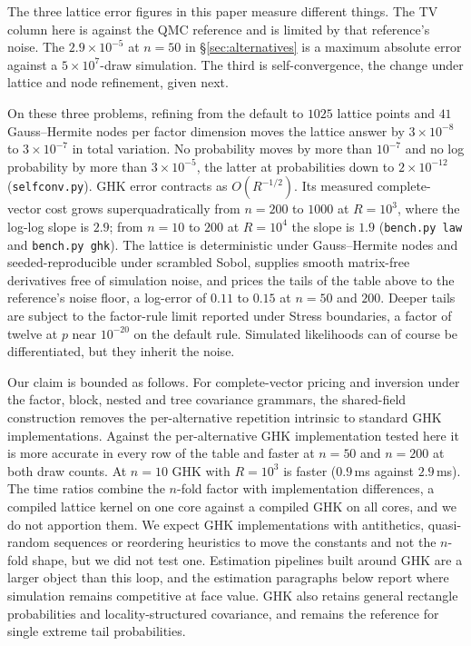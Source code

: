 \documentclass[11pt]{article}
\begin{document}
The three lattice error figures in this paper measure different things.
The TV column here is against the QMC reference and is limited by that
reference's noise. The $2.9\times10^{-5}$ at $n=50$ in
\S\ref{sec:alternatives} is a maximum absolute error against a
$5\times10^{7}$-draw simulation. The third is self-convergence, the
change under lattice and node refinement, given next.

On these three problems, refining from the default to $1025$ lattice
points and $41$ Gauss--Hermite nodes per factor dimension moves the
lattice answer by $3\times10^{-8}$ to $3\times10^{-7}$ in total
variation. No probability moves by more than $10^{-7}$ and no log
probability by more than $3\times10^{-5}$, the latter at probabilities
down to $2\times10^{-12}$ (\texttt{selfconv.py}). GHK error
contracts as $O(R^{-1/2})$. Its measured complete-vector cost grows
superquadratically from $n=200$ to $1000$ at $R=10^3$, where the log-log
slope is $2.9$; from $n=10$ to $200$ at $R=10^4$ the slope is $1.9$
(\texttt{bench.py law} and \texttt{bench.py ghk}). The lattice is deterministic under Gauss--Hermite nodes and
seeded-reproducible under scrambled Sobol, supplies smooth matrix-free
derivatives free of simulation noise, and prices the tails of the table
above to the reference's noise floor, a log-error of $0.11$ to $0.15$ at
$n=50$ and $200$. Deeper tails are subject to the factor-rule limit
reported under Stress boundaries, a factor of twelve at $p$ near
$10^{-20}$ on the default rule. Simulated
likelihoods can of course be differentiated, but they inherit the noise.

Our claim is bounded as follows. For complete-vector pricing and
inversion under the factor, block, nested and tree covariance grammars,
the shared-field construction removes the per-alternative repetition
intrinsic to standard GHK implementations. Against the
per-alternative GHK implementation tested here it is more accurate in
every row of the table and faster at $n=50$ and $n=200$ at both draw
counts. At $n=10$ GHK with $R=10^3$ is faster ($0.9$\,ms against
$2.9$\,ms). The time ratios combine the $n$-fold factor with
implementation differences, a compiled lattice kernel on one core
against a compiled GHK on all cores, and we do not apportion them.
We expect GHK implementations with antithetics, quasi-random sequences
or reordering heuristics to move the constants and not the $n$-fold
shape, but we did not test one.
Estimation pipelines built around GHK are a larger object than this loop,
and the estimation paragraphs below report where simulation remains
competitive at face value. GHK also retains general rectangle
probabilities and locality-structured covariance, and \citet{botev2017}
remains the reference for single extreme tail probabilities.
\end{document}
